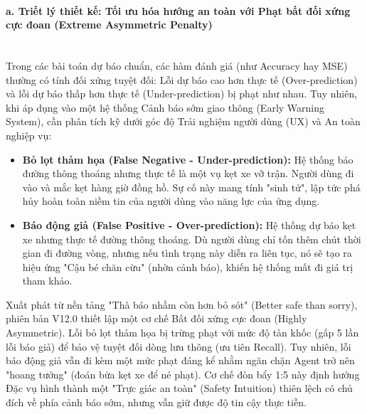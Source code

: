 \paragraph{a. Triết lý thiết kế: Tối ưu hóa hướng an toàn với Phạt bất đối xứng cực đoan (Extreme Asymmetric Penalty)} \mbox{} \\
Trong các bài toán dự báo chuẩn, các hàm đánh giá (như Accuracy hay MSE) thường có tính đối xứng tuyệt đối: Lỗi dự báo cao hơn thực tế (Over-prediction) và lỗi dự báo thấp hơn thực tế (Under-prediction) bị phạt như nhau. Tuy nhiên, khi áp dụng vào một hệ thống Cảnh báo sớm giao thông (Early Warning System), cần phân tích kỹ dưới góc độ Trải nghiệm người dùng (UX) và An toàn nghiệp vụ:
\begin{itemize}
    \item \textbf{Bỏ lọt thảm họa (False Negative - Under-prediction):} Hệ thống báo đường thông thoáng nhưng thực tế là một vụ kẹt xe vỡ trận. Người dùng đi vào và mắc kẹt hàng giờ đồng hồ. Sự cố này mang tính "sinh tử", lập tức phá hủy hoàn toàn niềm tin của người dùng vào năng lực của ứng dụng.
    \item \textbf{Báo động giả (False Positive - Over-prediction):} Hệ thống dự báo kẹt xe nhưng thực tế đường thông thoáng. Dù người dùng chỉ tốn thêm chút thời gian đi đường vòng, nhưng nếu tình trạng này diễn ra liên tục, nó sẽ tạo ra hiệu ứng "Cậu bé chăn cừu" (nhờn cảnh báo), khiến hệ thống mất đi giá trị tham khảo.
\end{itemize}
Xuất phát từ nền tảng "Thà báo nhầm còn hơn bỏ sót" (Better safe than sorry), phiên bản V12.0 thiết lập một cơ chế Bất đối xứng cực đoan (Highly Asymmetric). Lỗi bỏ lọt thảm họa bị trừng phạt với mức độ tàn khốc (gấp 5 lần lỗi báo giả) để bảo vệ tuyệt đối dòng lưu thông (ưu tiên Recall). Tuy nhiên, lỗi báo động giả vẫn đi kèm một mức phạt đáng kể nhằm ngăn chặn Agent trở nên "hoang tưởng" (đoán bừa kẹt xe để né phạt). Cơ chế đòn bẩy 1:5 này định hướng Đặc vụ hình thành một "Trực giác an toàn" (Safety Intuition) thiên lệch có chủ đích về phía cảnh báo sớm, nhưng vẫn giữ được độ tin cậy thực tiễn.

